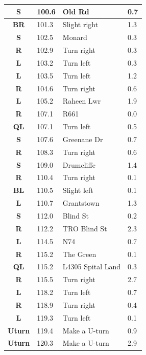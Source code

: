 \documentclass[11pt]{article}
\begin{document}
\begin{center}
\begin{supertabular}{|c|p{0.30in}|p{2.25in}|l|}
 \textbf{S} & 100.6 & Old Rd &   0.7 \\ \hline
{} \textbf{BR} & 101.3 & Slight right &   1.3 \\ \hline
 \textbf{S} & 102.5 & Monard &   0.3 \\ \hline
{} \textbf{R} & 102.9 & Turn right &   0.3 \\ \hline
 \textbf{L} & 103.2 & Turn left &   0.3 \\ \hline
 \textbf{L} & 103.5 & Turn left &   1.2 \\ \hline
{} \textbf{R} & 104.6 & Turn right &   0.6 \\ \hline
 \textbf{L} & 105.2 & Raheen Lwr &   1.9 \\ \hline
{} \textbf{R} & 107.1 & R661 &   0.0 \\ \hline
 \textbf{QL} & 107.1 & Turn left &   0.5 \\ \hline
 \textbf{S} & 107.6 & Greenane Dr &   0.7 \\ \hline
{} \textbf{R} & 108.3 & Turn right &   0.6 \\ \hline
 \textbf{S} & 109.0 & Drumcliffe &   1.4 \\ \hline
{} \textbf{R} & 110.4 & Turn right &   0.1 \\ \hline
 \textbf{BL} & 110.5 & Slight left &   0.1 \\ \hline
 \textbf{L} & 110.7 & Grantstown &   1.3 \\ \hline
 \textbf{S} & 112.0 & Blind St &   0.2 \\ \hline
{} \textbf{R} & 112.2 & TRO Blind St &   2.3 \\ \hline
 \textbf{L} & 114.5 & N74 &   0.7 \\ \hline
{} \textbf{R} & 115.2 & The Green &   0.1 \\ \hline
 \textbf{QL} & 115.2 & L4305 Spital Land &   0.3 \\ \hline
{} \textbf{R} & 115.5 & Turn right &   2.7 \\ \hline
 \textbf{L} & 118.2 & Turn left &   0.7 \\ \hline
{} \textbf{R} & 118.9 & Turn right &   0.4 \\ \hline
 \textbf{L} & 119.3 & Turn left &   0.1 \\ \hline
 \textbf{Uturn} & 119.4 & Make a U-turn &   0.9 \\ \hline
 \textbf{Uturn} & 120.3 & Make a U-turn &   2.9 \\ \hline

\end{supertabular}
\end{center}
\end{document}
